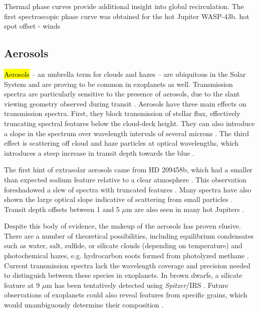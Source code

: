 \documentclass[graybox,natbib,nosecnum]{svmult}
\newcommand{\hbindex}[1]{\hl{#1}\index{#1}}  %
\newcommand{\project}[1]{\textsl{#1}}
\newcommand{\Spitzer}{\project{Spitzer}}
\begin{document}
Thermal phase curves provide additional insight into global recirculation.
The first spectroscopic phase curve was obtained for the hot Jupiter WASP-43b.  
hot spot offset - winds


\subsection{Aerosols}
\hbindex{Aerosols} -- an umbrella term for clouds and hazes -- are ubiquitous in the Solar System and are proving to be common in exoplanets as well. Transmission spectra are particularly sensitive to the presence of aerosols, due to the slant viewing geometry observed during transit \citep{fortney05}.  Aerosols have three main effects on transmission spectra.  First, they block transmission of stellar flux, effectively truncating spectral features below the cloud-deck height.  They can also introduce a slope in the spectrum over wavelength intervals of several microns \citep[e.g][]{sing16}.  The third effect is scattering off cloud and haze particles at optical wavelengths, which introduces a steep increase in transit depth towards the blue \citep[e.g.][]{pont08}.

The first hint of extrasolar aerosols came from HD 209458b, which had a smaller than expected sodium feature relative to a clear atmosphere \citep{charbonneau02}. This observation foreshadowed a slew of spectra with truncated features \citep[e.g.][]{deming13, crossfield13, kreidberg14a, knutson14a, kreidberg15b}. Many spectra have also shown the large optical slope indicative of scattering from small particles \citep[e.g][]{sing11, sing13, robinson14, dragomir15}. Transit depth offsets between 1 and 5 $\mu$m are also seen in many hot Jupiters \citep{sing16}.

Despite this body of evidence, the makeup of the aerosols has proven elusive. There are a number of theoretical possibilities, including equilibrium condensates such as water, salt, sulfide, or silicate clouds (depending on temperature) and photochemical hazes, e.g. hydrocarbon soots formed from photolyzed methane \citep{burrows99, kempton12, morley13, wakeford17}. Current transmission spectra lack the wavelength coverage and precision needed to distinguish between these species in exoplanets.  In brown dwarfs, a silicate feature at 9 $\mu$m has been tentatively detected using \Spitzer/IRS \citep{cushing06}. Future observations of exoplanets could also reveal features from specific grains, which would unambiguously determine their composition \citep{wakeford15}.
\end{document}
